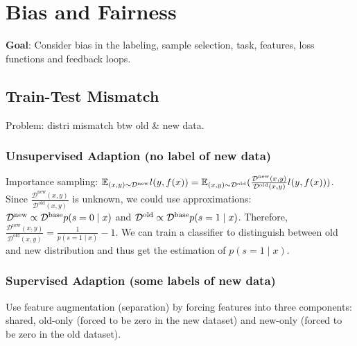 \section{Bias and Fairness}

\textbf{Goal}: Consider bias in the labeling, sample selection, task, features, loss functions and feedback loops.

\subsection*{Train-Test Mismatch}

Problem: distri mismatch btw old \& new data.

\subsubsection*{Unsupervised Adaption (no label of new data)}
Importance sampling: $\mathbb{E}_{(x,y)\sim \mathcal{D}^{\text{new}}} l(y, f(x)) = \mathbb{E}_{(x,y)\sim \mathcal{D}^{\text{old}}} (\frac{\mathcal{D}^{\text{new}}(x,y)}{\mathcal{D}^{\text{old}}(x,y)}l(y,f(x)))$. Since $\frac{\mathcal{D}^{\text{new}}(x,y)}{\mathcal{D}^{\text{old}}(x,y)}$ is unknown, we could use approximations: $\mathcal{D}^{\text{new}} \propto \mathcal{D}^{\text{base}}p(s=0\mid x)$ and $\mathcal{D}^{\text{old}} \propto \mathcal{D}^{\text{base}}p(s=1\mid x)$. Therefore, $\frac{\mathcal{D}^{\text{new}}(x,y)}{\mathcal{D}^{\text{old}}(x,y)} = \frac{1}{p(s=1\mid x)}-1$. We can train a classifier to distinguish between old and new distribution and thus get the estimation of $p(s=1\mid x)$.

\subsubsection*{Supervised Adaption (some labels of new data)}

Use feature augmentation (separation) by forcing features into three components: shared, old-only (forced to be zero in the new dataset) and new-only (forced to be zero in the old dataset).

